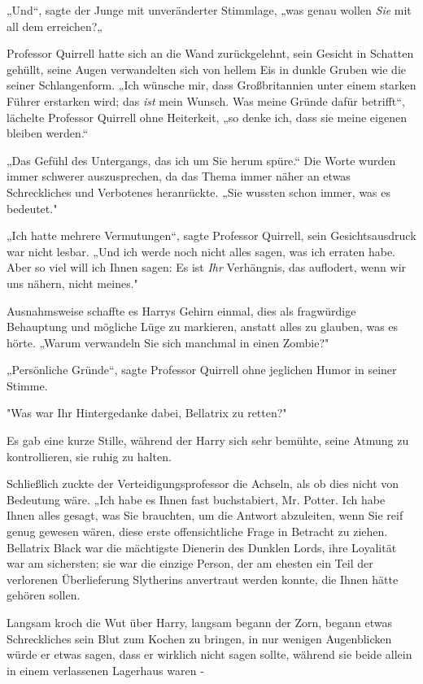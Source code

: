 {„Und“, sagte der Junge mit unveränderter Stimmlage, „was genau wollen \emph{Sie} mit all dem erreichen?„

Professor Quirrell hatte sich an die Wand zurückgelehnt, sein Gesicht in Schatten gehüllt, seine Augen verwandelten sich von hellem Eis in dunkle Gruben wie die seiner Schlangenform. „Ich wünsche mir, dass Großbritannien unter einem starken Führer erstarken wird; das \emph{ist} mein Wunsch. Was meine Gründe dafür betrifft“, lächelte Professor Quirrell ohne Heiterkeit, „so denke ich, dass sie meine eigenen bleiben werden.“

„Das Gefühl des Untergangs, das ich um Sie herum spüre.“ Die Worte wurden immer schwerer auszusprechen, da das Thema immer näher an etwas Schreckliches und Verbotenes heranrückte. „Sie wussten schon immer, was es bedeutet."

„Ich hatte mehrere Vermutungen“, sagte Professor Quirrell, sein Gesichtsausdruck war nicht lesbar. „Und ich werde noch nicht alles sagen, was ich erraten habe. Aber so viel will ich Ihnen sagen: Es ist \emph{Ihr} Verhängnis, das auflodert, wenn wir uns nähern, nicht meines."

Ausnahmsweise schaffte es Harrys Gehirn einmal, dies als fragwürdige Behauptung und mögliche Lüge zu markieren, anstatt alles zu glauben, was es hörte. „Warum verwandeln Sie sich manchmal in einen Zombie?"

„Persönliche Gründe“, sagte Professor Quirrell ohne jeglichen Humor in seiner Stimme.

"Was war Ihr Hintergedanke dabei, Bellatrix zu retten?"

Es gab eine kurze Stille, während der Harry sich sehr bemühte, seine Atmung zu kontrollieren, sie ruhig zu halten.

Schließlich zuckte der Verteidigungsprofessor die Achseln, als ob dies nicht von Bedeutung wäre. „Ich habe es Ihnen fast buchstabiert, Mr. Potter. Ich habe Ihnen alles gesagt, was Sie brauchten, um die Antwort abzuleiten, wenn Sie reif genug gewesen wären, diese erste offensichtliche Frage in Betracht zu ziehen. Bellatrix Black war die mächtigste Dienerin des Dunklen Lords, ihre Loyalität war am sichersten; sie war die einzige Person, der am ehesten ein Teil der verlorenen Überlieferung Slytherins anvertraut werden konnte, die Ihnen hätte gehören sollen.

Langsam kroch die Wut über Harry, langsam begann der Zorn, begann etwas Schreckliches sein Blut zum Kochen zu bringen, in nur wenigen Augenblicken würde er etwas sagen, dass er wirklich nicht sagen sollte, während sie beide allein in einem verlassenen Lagerhaus waren -

}
